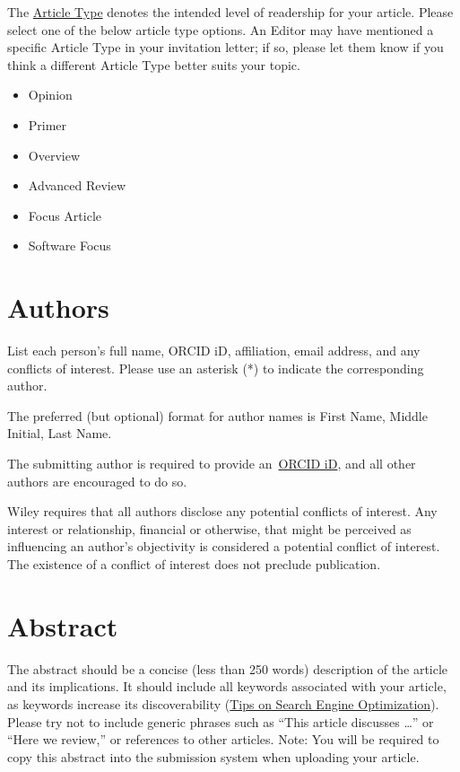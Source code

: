\documentclass[10pt]{article}
\providecommand{\tightlist}{\setlength{\itemsep}{0pt}\setlength{\parskip}{0pt}}%
\begin{document}
{\label{925764}}

The \href{http://wires.wiley.com/go/forauthors\#ArticleTypes}{Article
Type} denotes the intended level of readership for your article. Please
select one of the below article type options. An Editor may have
mentioned a specific Article Type in your invitation letter; if so,
please let them know if you think a different Article Type better suits
your topic.~

\begin{itemize}
\tightlist
\item
  Opinion
\item
  Primer
\item
  Overview
\item
  Advanced Review
\item
  Focus Article
\item
  Software Focus
\end{itemize}

\section*{Authors}

{\label{290010}}

List each person's full name, ORCID iD, affiliation, email address, and
any conflicts of interest. Please use an asterisk (*) to indicate the
corresponding author.

The preferred (but optional) format for author names is First Name,
Middle Initial, Last Name.~~

The submitting author is required to provide
an~\href{https://authorservices.wiley.com/author-resources/Journal-Authors/Submission/orcid.html}{ORCID
iD}, and all other authors are encouraged to do so.~

Wiley requires that all authors disclose any potential conflicts of
interest. Any interest or relationship, financial or otherwise, that
might be perceived as influencing an author's objectivity is considered
a potential conflict of interest. The existence of a conflict of
interest does not preclude publication.

\section*{Abstract}

{\label{468816}}

The abstract should be a concise (less than 250 words) description of
the article and its implications. It should include all keywords
associated with your article, as keywords increase its discoverability
(\href{https://authorservices.wiley.com/author-resources/Journal-Authors/Prepare/writing-for-seo.html}{Tips
on Search Engine Optimization}). Please try not to include generic
phrases such as ``This article discusses \ldots{}'' or ``Here we
review,'' or references to other articles. Note: You will be required to
copy this abstract into the submission system when uploading your
article.
\end{document}
